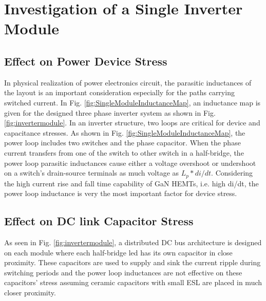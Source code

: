 \section{Investigation of a Single Inverter Module}
\label{chap:curr_driven_rect}

\subsection{Effect on Power Device Stress}

In physical realization of power electronics circuit, the parasitic inductances of the layout is an important consideration especially for the paths carrying switched current. In Fig. \ref{fig:SingleModuleInductanceMap}, an inductance map is given for the designed three phase inverter system as shown in Fig.\ref{fig:invertermodule}. In an inverter structure, two loops are critical for device and capacitance stresses. As shown in Fig. \ref{fig:SingleModuleInductanceMap}, the power loop includes two switches and the phase capacitor. When the phase current transfers from one of the switch to other switch in a half-bridge, the power loop parasitic inductances cause either a voltage overshoot or undershoot on a switch's drain-source terminals as much voltage as $L_p*di/dt$. Considering the high current rise and fall time capability of GaN HEMTs, i.e. high di/dt, the power loop inductance is very the most important factor for device stress.






\subsection{Effect on DC link Capacitor Stress}

As seen in Fig. \ref{fig:invertermodule}, a distributed DC bus architecture is designed on each module where each half-bridge led has its own capacitor in close proximity. These capacitors are used to supply and sink the current ripple during switching periods and the power loop inductances are not effective on these capacitors' stress assuming ceramic capacitors with small ESL are placed in much closer proximity.

